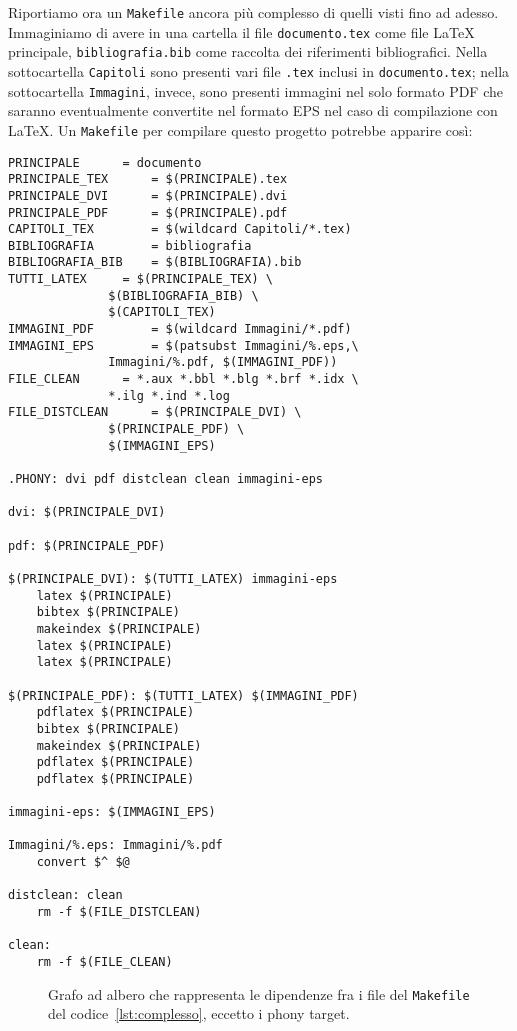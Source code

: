 Riportiamo ora un \verb|Makefile| ancora più complesso di quelli visti fino ad
adesso. Immaginiamo di avere in una cartella il file \verb|documento.tex| come
file \LaTeX{}
principale, \verb|bibliografia.bib| come raccolta dei riferimenti bibliografici.
Nella sottocartella \verb|Capitoli| sono presenti vari file \verb|.tex| inclusi
in \verb|documento.tex|; nella sottocartella \verb|Immagini|, invece, sono
presenti immagini nel solo formato \textsc{PDF} che saranno eventualmente
convertite nel formato \textsc{EPS} nel caso di compilazione con \LaTeX.  Un
\verb|Makefile| per compilare questo progetto potrebbe apparire così:
\begin{lstlisting}[caption={Un \texttt{Makefile} complesso.},
label=lst:complesso]
PRINCIPALE 		= documento
PRINCIPALE_TEX		= $(PRINCIPALE).tex
PRINCIPALE_DVI		= $(PRINCIPALE).dvi
PRINCIPALE_PDF		= $(PRINCIPALE).pdf
CAPITOLI_TEX		= $(wildcard Capitoli/*.tex)
BIBLIOGRAFIA		= bibliografia
BIBLIOGRAFIA_BIB	= $(BIBLIOGRAFIA).bib
TUTTI_LATEX		= $(PRINCIPALE_TEX) \
			  $(BIBLIOGRAFIA_BIB) \
			  $(CAPITOLI_TEX)
IMMAGINI_PDF		= $(wildcard Immagini/*.pdf)
IMMAGINI_EPS		= $(patsubst Immagini/%.eps,\
			  Immagini/%.pdf, $(IMMAGINI_PDF))
FILE_CLEAN		= *.aux *.bbl *.blg *.brf *.idx \
			  *.ilg *.ind *.log
FILE_DISTCLEAN		= $(PRINCIPALE_DVI) \
			  $(PRINCIPALE_PDF) \
			  $(IMMAGINI_EPS)

.PHONY: dvi pdf distclean clean immagini-eps

dvi: $(PRINCIPALE_DVI)

pdf: $(PRINCIPALE_PDF)

$(PRINCIPALE_DVI): $(TUTTI_LATEX) immagini-eps
	latex $(PRINCIPALE)
	bibtex $(PRINCIPALE)
	makeindex $(PRINCIPALE)
	latex $(PRINCIPALE)
	latex $(PRINCIPALE)

$(PRINCIPALE_PDF): $(TUTTI_LATEX) $(IMMAGINI_PDF)
	pdflatex $(PRINCIPALE)
	bibtex $(PRINCIPALE)
	makeindex $(PRINCIPALE)
	pdflatex $(PRINCIPALE)
	pdflatex $(PRINCIPALE)

immagini-eps: $(IMMAGINI_EPS)

Immagini/%.eps: Immagini/%.pdf
	convert $^ $@

distclean: clean
	rm -f $(FILE_DISTCLEAN)

clean:
	rm -f $(FILE_CLEAN)
\end{lstlisting}
\begin{figure}
  \centering
  \caption{Grafo ad albero che rappresenta le dipendenze fra i file del
    \texttt{Makefile} del codice~\ref{lst:complesso}, eccetto i phony target.}
  \label{fig:grafo-albero2}
\end{figure}
